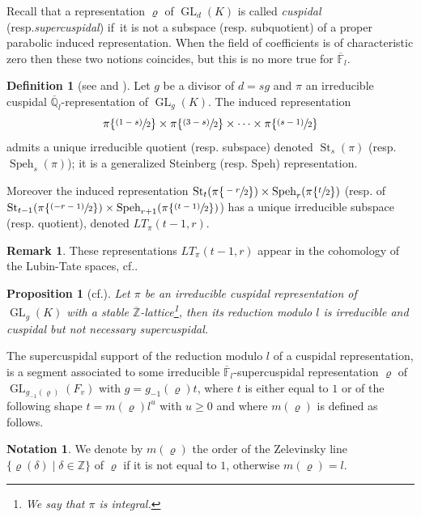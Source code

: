 \documentclass[11pt]{article}
\newcommand{\cf}{cf.\xspace}
\newcommand{\resp}{resp.\xspace}
\let\sep\mid
\newcommand{\psfrac}[2]{\sfrac{(#1)}{#2}}
\DeclareMathOperator{\GL}{GL}
\theoremstyle{plain}
\newtheorem{prop}[equation]{Proposition}
\theoremstyle{definition}
\newtheorem{defin}[equation]{Definition}
\newtheorem*{remark}{Remark}
\newtheorem{nota}[equation]{Notation}
\numberwithin{equation}{subsection}
\newcommand\Fm{{\mathbb F}}
\newcommand\Qm{{\mathbb Q}}
\newcommand\Zm{{\mathbb Z}}
\DeclareMathOperator{\speh}{Speh}
\DeclareMathOperator{\st}{St}
\begin{document}
Recall that a representation
$\varrho$ of $\GL_d(K)$ is called \emph{cuspidal} (\resp \emph{supercuspidal})
if~it is not a subspace (\resp subquotient) of a proper parabolic induced representation.
When the field of coefficients is of characteristic zero then these two notions coincides,
but this is no more true for $\overline \Fm_l$.

\begin{defin}[{see \cite[\S9]{zelevinski2} and \cite[\S1.4]{boyer-compositio}}] \label{defi-rep}
Let $g$ be a divisor of $d=sg$ and $\pi$ an irreducible cuspidal
$\overline \Qm_l$-representation of $\GL_g(K)$.
The induced representation
\[
\pi\{\psfrac{1-s}{2}\} \times \pi \{\psfrac{3-s}{2}\} \times \cdots \times \pi \{\psfrac{s-1}{2}\}
\]
admits a unique irreducible quotient (\resp subspace) denoted $\st_s(\pi)$ (\resp $\speh_s(\pi)$); it is a generalized Steinberg (\resp Speh) representation.

Moreover the induced representation $\st_t(\pi \{\sfrac{-r}{2}\}) \times \speh_r(\pi \{\sfrac{t}{2}\})$
(\resp of $\st_{t-1}(\pi \{\psfrac{-r-1}{2}\}) \times \speh_{r+1}(\pi \{\psfrac{t-1}{2}\})$)
has a unique irreducible subspace (\resp quotient), denoted
$LT_\pi(t-1,r)$.
\end{defin}

\begin{remark}
These representations $LT_\pi(t-1,r)$ appear in the cohomology of the Lubin-Tate
spaces, \cf \cite{boyer-invent2}.
\end{remark}

\begin{prop}[{\cf \cite[III.5.10]{vigneras-livre}}] \label{prop-red-modl}
Let $\pi$ be an irreducible cuspidal representation of $\GL_g(K)$ with a stable
$\overline \Zm$-lattice\footnote{We say that $\pi$ is integral.}, then its reduction modulo $l$
is irreducible and cuspidal but not necessary supercuspidal.
\end{prop}

The supercuspidal support of the reduction modulo $l$ of a cuspidal representation,
is a segment associated to some irreducible $\overline \Fm_l$-supercuspidal representation
$\varrho$ of $\GL_{g_{-1}(\varrho)}(F_v)$ with $g=g_{-1}(\varrho) t$, where $t$ is
either equal to $1$ or of the following shape
$t=m(\varrho)l^u$ with $u \geq 0$ and where $m(\varrho)$ is defined as follows.

\begin{nota} \label{nota-mvarrho}
We denote by $m(\varrho)$ the order of the Zelevinsky line
$\{\varrho(\delta)\sep \delta \in \Zm\}$ of
$\varrho$ if it is not equal to $1$, otherwise $m(\varrho)=l$.
\end{nota}
\end{document}
